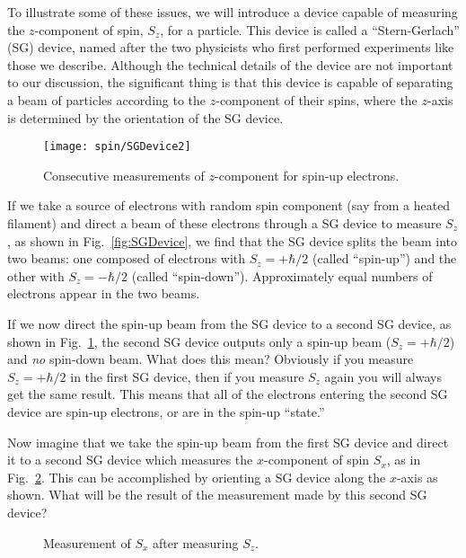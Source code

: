 To illustrate some of these issues, we will introduce a device capable of
measuring the $z$-component of spin, $S_z$, for a particle.  This device
is called a ``Stern-Gerlach'' (SG) device, named after the two physicists
who first performed experiments like those we describe.  Although the
technical details of the device are not important to our discussion,
the significant thing is that this device is capable of separating a
beam of particles according to the $z$-component of their spins, where
the $z$-axis is determined by the orientation of the SG device.

\begin{figure}[b]
\begin{center}
\texttt{[image: spin/SGDevice2]}
\caption{Consecutive measurements of $z$-component for spin-up electrons.}
\label{fig:SGDevice2}
\end{center}
\end{figure}


If we take a source of electrons with random spin component (say from a
heated filament) and direct a beam of these electrons through a SG device
to measure $S_z$, as shown in Fig.~\ref{fig:SGDevice}, we find that the
SG device splits the beam into two beams: one composed of electrons with
$S_z = +\hbar/2$ (called ``spin-up'') and the other with $S_z = -\hbar/2$
(called ``spin-down'').  Approximately equal numbers of electrons appear
in the two beams.

If we now direct the spin-up beam from the SG device to a second SG
device, as shown in Fig.~\ref{fig:SGDevice2}, the second SG device
outputs only a spin-up beam ($S_z = +\hbar/2$) and {\it no\/} spin-down
beam.  What does this mean?  Obviously if you measure $S_z = +\hbar/2$
in the first SG device, then if you measure $S_z$ again you will always
get the same result.  This means that all of the electrons entering the
second SG device are spin-up electrons, or are in the spin-up ``state.''

Now imagine that we take the spin-up beam from the first SG device and
direct it to a second SG device which measures the $x$-component of spin
$S_x$, as in Fig.~\ref{fig:SGDevice3}.  This can be accomplished by
orienting a SG device along the $x$-axis as shown.  What will be the
result of the measurement made by this second SG device?

\begin{figure}
\begin{center}
\caption{Measurement of $S_x$ after measuring $S_z$.}
\label{fig:SGDevice3}
\end{center}
\end{figure}

